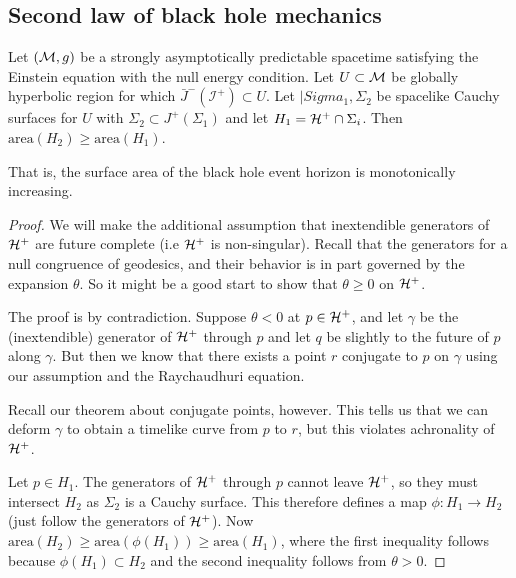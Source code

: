 \subsection*{Second law of black hole mechanics}
\begin{thm}[Hawking 1972]
    Let $(\mathcal{M},g)$ be a strongly asymptotically predictable spacetime satisfying the Einstein equation with the null energy condition. Let $U\subset \mathcal{M}$ be globally hyperbolic region for which $\bar J^-(\mathcal{I}^+)\subset U$.  Let $|Sigma_1,\Sigma_2$ be spacelike Cauchy surfaces for $U$ with $\Sigma_2 \subset J^+(\Sigma_1)$ and let $H_1=\mathcal H^+ \cap \Sigma_i$. Then $\text{area}(H_2) \geq \text{area}(H_1)$.
\end{thm}
That is, the surface area of the black hole event horizon is monotonically increasing.
\begin{proof}
    We will make the additional assumption that inextendible generators of $\mathcal H^+$ are future complete (i.e $\mathcal H^+$ is non-singular). Recall that the generators for a null congruence of geodesics, and their behavior is in part governed by the expansion $\theta$. So it might be a good start to show that $\theta \geq 0$ on $\mathcal H^+$.
    
    The proof is by contradiction. Suppose $\theta < 0$ at $p\in \mathcal H^+$, and let $\gamma$ be the (inextendible) generator of $\mathcal H^+$ through $p$ and let $q$ be slightly to the future of $p$ along $\gamma$. But then we know that there exists a point $r$ conjugate to $p$ on $\gamma$ using our assumption and the Raychaudhuri equation.
    
    Recall our theorem about conjugate points, however. %
    This tells us that we can deform $\gamma$ to obtain a timelike curve from $p$ to $r$, but this violates achronality of $\mathcal H^+$.
    
    Let $p\in H_1$. The generators of $\mathcal H^+$ through $p$ cannot leave $\mathcal H^+$, so they must intersect $H_2$ as $\Sigma_2$ is a Cauchy surface. This therefore defines a map $\phi:H_1 \to H_2$ (just follow the generators of $\mathcal H^+$). Now $\text{area}(H_2) \geq \text{area}(\phi(H_1)) \geq \text{area}(H_1)$, where the first inequality follows because $\phi(H_1) \subset H_2$ and the second inequality follows from $\theta >0$.
\end{proof}

